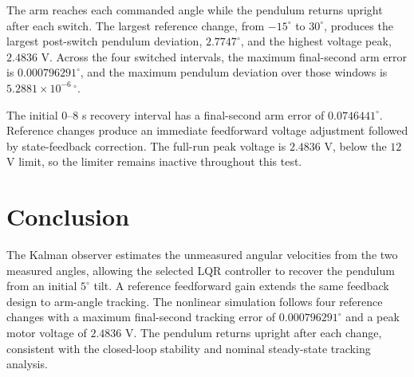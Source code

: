 \documentclass[conference]{IEEEtran}
\begin{document}
The arm reaches each commanded angle while the pendulum returns upright after each switch. The largest reference change, from $-15^\circ$ to $30^\circ$, produces the largest post-switch pendulum deviation, $2.7747^\circ$, and the highest voltage peak, $2.4836$ V. Across the four switched intervals, the maximum final-second arm error is $0.000796291^\circ$, and the maximum pendulum deviation over those windows is $5.2881\!\times\!10^{-6}\,^\circ$.

The initial $0$--$8$ s recovery interval has a final-second arm error of $0.0746441^\circ$. Reference changes produce an immediate feedforward voltage adjustment followed by state-feedback correction. The full-run peak voltage is $2.4836$ V, below the $12$ V limit, so the limiter remains inactive throughout this test.

\section{Conclusion}

The Kalman observer estimates the unmeasured angular velocities from the two measured angles, allowing the selected LQR controller to recover the pendulum from an initial $5^\circ$ tilt. A reference feedforward gain extends the same feedback design to arm-angle tracking. The nonlinear simulation follows four reference changes with a maximum final-second tracking error of $0.000796291^\circ$ and a peak motor voltage of $2.4836$ V. The pendulum returns upright after each change, consistent with the closed-loop stability and nominal steady-state tracking analysis.


\clearpage
\appendices
\end{document}
